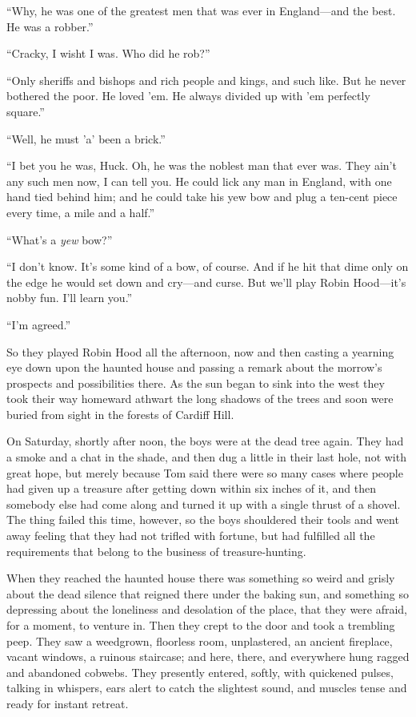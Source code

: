 \documentclass{book}
\begin{document}
“Why, he was one of the greatest men that was ever in England—and the best. He was a robber.”

“Cracky, I wisht I was. Who did he rob?”

“Only sheriffs and bishops and rich people and kings, and such like. But he never bothered the poor. He loved ’em. He always divided up with ’em perfectly square.”

“Well, he must ’a’ been a brick.”

“I bet you he was, Huck. Oh, he was the noblest man that ever was. They ain’t any such men now, I can tell you. He could lick any man in England, with one hand tied behind him; and he could take his yew bow and plug a ten-cent piece every time, a mile and a half.”

“What’s a \emph{yew} bow?”

“I don’t know. It’s some kind of a bow, of course. And if he hit that dime only on the edge he would set down and cry—and curse. But we’ll play Robin Hood—it’s nobby fun. I’ll learn you.”

“I’m agreed.”

So they played Robin Hood all the afternoon, now and then casting a yearning eye down upon the haunted house and passing a remark about the morrow’s prospects and possibilities there. As the sun began to sink into the west they took their way homeward athwart the long shadows of the trees and soon were buried from sight in the forests of Cardiff Hill.

On Saturday, shortly after noon, the boys were at the dead tree again. They had a smoke and a chat in the shade, and then dug a little in their last hole, not with great hope, but merely because Tom said there were so many cases where people had given up a treasure after getting down within six inches of it, and then somebody else had come along and turned it up with a single thrust of a shovel. The thing failed this time, however, so the boys shouldered their tools and went away feeling that they had not trifled with fortune, but had fulfilled all the requirements that belong to the business of treasure-hunting.

When they reached the haunted house there was something so weird and grisly about the dead silence that reigned there under the baking sun, and something so depressing about the loneliness and desolation of the place, that they were afraid, for a moment, to venture in. Then they crept to the door and took a trembling peep. They saw a weedgrown, floorless room, unplastered, an ancient fireplace, vacant windows, a ruinous staircase; and here, there, and everywhere hung ragged and abandoned cobwebs. They presently entered, softly, with quickened pulses, talking in whispers, ears alert to catch the slightest sound, and muscles tense and ready for instant retreat.
\end{document}
